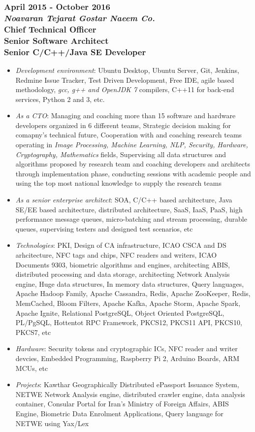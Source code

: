 \documentclass[10pt,a4paper]{article}
\begin{document}
\subsubsection{{April 2015 - October 2016} \\ \textnormal {\textit {Noavaran Tejarat Gostar Naeem Co.}} \\ {Chief Technical Officer \\ Senior Software Architect \\ Senior C/C++/Java SE Developer}}
  \setlength{\leftskip}{0.5cm}
  \setlength{\rightskip}{1cm}
  \begin{itemize}
    \setlength{\rightskip}{1cm}
    \setlength\itemsep{0em}
    \item \small \textit {Development environment}: Ubuntu Desktop, Ubuntu Server, Git, Jenkins, Redmine Issue Tracker, Test Driven Development, Free IDE, agile based methodology, \textit {gcc, g++ and OpenJDK 7} compilers, C++11 for back-end services, Python 2 and 3, etc.
    \item \small \textit {As a CTO}: Managing and coaching more than 15 software and hardware developers organized in 6 different teams, Strategic decision making for comapny's technical future, Cooperation with and coaching research teams operating in \textit {Image Processing, Machine Learning, NLP, Security, Hardware, Cryptography, Mathematics} fields, Supervising all data structures and algorithms proposed by research team and coaching developers and architects through implementation phase, conducting sessions with academic people and using the top most national knowledge to supply the research teams
    \item \small \textit {As a senior enterprise architect}: SOA, C/C++ based architecture, Java SE/EE based architecture, distributed architecture, SaaS, IaaS, PaaS, high performance message queues, micro-batching and stream processing, durable queues, supervising testers and designed test scenarios, etc
    \item \small \textit {Technologies}: PKI, Design of CA infrastructure, ICAO CSCA and DS arhcitecture, NFC tags and chips, NFC readers and writers, ICAO Documents 9303, biometric algorithms and engines, architecting ABIS, distributed processing and data storage, architecting Network Analysis engine, Huge data structures, In memory data structures, Query languages, Apache Hadoop Family, Apache Cassandra, Redis, Apache ZooKeeper, Redis, MemCached, Bloom Filters, Apache Kafka, Apache Storm, Apache Spark, Apache Ignite, Relational PostgreSQL, Object Oriented PostgreSQL, PL/PgSQL, Hottentot RPC Framework, PKCS12, PKCS11 API, PKCS10, PKCS7, etc
    \item \small \textit {Hardware}: Security tokens and cryptographic ICs, NFC reader and writer devcies, Embedded Programming, Raspberry Pi 2, Arduino Boards, ARM MCUs, etc
    \item \small \textit {Projects}: Kawthar Geographically Distributed ePassport Issuance System, NETWE Network Analysis engine, distributed crawler engine, data analysis container, Consular Portal for Iran's Ministry of Foreign Affairs, ABIS Engine, Biometric Data Enrolment Applications, Query language for NETWE using Yax/Lex
  \end{itemize}
\end{document}
